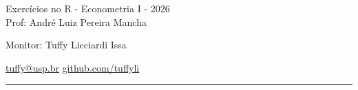 \documentclass[12pt,letterpaper, onecolumn]{exam}
\begin{document}
\begingroup  
    \centering
    \LARGE Exercícios no R - Econometria I - 2026\\[0.5em]
    \large Prof: André Luiz Pereira Mancha \par
    \large Monitor: Tuffy Licciardi Issa  \par
   \small \href{mailto:tuffy@usp.br}{tuffy@usp.br} \quad
\href{https://github.com/Tuffyli}{github.com/tuffyli} \par
\endgroup
\rule{\textwidth}{0.4pt}
\pointsdroppedatright   %
\printanswers
\renewcommand{\solutiontitle}{\noindent\textbf{Ans:}\enspace}   %
\end{document}
